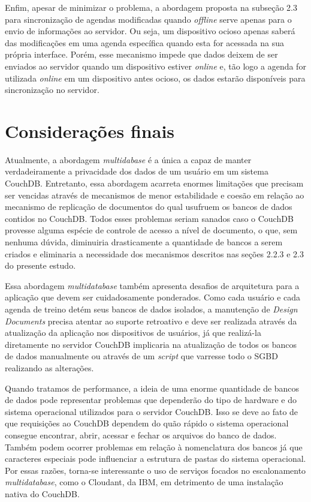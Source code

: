\documentclass[
	article,			%
	11pt,				%
	oneside,			%
	a4paper,			%
	english,			%
	brazil,				%
	sumario=tradicional
	]{abntex2}
\begin{document}
Enfim, apesar de minimizar o problema, a abordagem proposta na subseção 2.3 para sincronização de agendas modificadas quando \textit{offline} serve apenas para o envio de informações ao servidor. Ou seja, um dispositivo ocioso apenas saberá das modificações em uma agenda específica quando esta for acessada na sua própria interface. Porém, esse mecanismo impede que dados deixem de ser enviados ao servidor quando um dispositivo estiver \textit{online} e, tão logo a agenda for utilizada \textit{online} em um dispositivo antes ocioso, os dados estarão disponíveis para sincronização no servidor.

\section*{Considerações finais}

Atualmente, a abordagem \textit{multidabase} é a única a capaz de manter verdadeiramente a privacidade dos dados de um usuário em um sistema CouchDB. Entretanto, essa abordagem acarreta enormes limitações que precisam ser vencidas através de mecanismos de menor estabilidade e coesão em relação ao mecanismo de replicação de documentos do qual usufruem os bancos de dados contidos no CouchDB. Todos esses problemas seriam sanados caso o CouchDB provesse alguma espécie de controle de acesso a nível de documento, o que, sem nenhuma dúvida, diminuiria drasticamente a quantidade de bancos a serem criados e eliminaria a necessidade dos mecanismos descritos nas seções 2.2.3 e 2.3 do presente estudo.

Essa abordagem \textit{multidatabase} também apresenta desafios de arquitetura para a aplicação que devem ser cuidadosamente ponderados. Como cada usuário e cada agenda de treino detém seus bancos de dados isolados, a manutenção de \textit{Design Documents} precisa atentar ao suporte retroativo e deve ser realizada através da atualização da aplicação nos dispositivos de usuários, já que realizá-la diretamente no servidor CouchDB implicaria na atualização de todos os bancos de dados manualmente ou através de um \textit{script} que varresse todo o SGBD realizando as alterações.

Quando tratamos de performance, a ideia de uma enorme quantidade de bancos de dados pode representar problemas que dependerão do tipo de hardware e do sistema operacional utilizados para o servidor CouchDB. Isso se deve ao fato de que requisições ao CouchDB dependem do quão rápido o sistema operacional consegue encontrar, abrir, acessar e fechar os arquivos do banco de dados. Também podem ocorrer problemas em relação à nomenclatura dos bancos já que caracteres especiais pode influenciar a estrutura de pastas do sistema operacional. Por essas razões, torna-se interessante o uso de serviços focados no escalonamento \textit{multidatabase}, como o Cloudant, da IBM, em detrimento de uma instalação nativa do CouchDB.
\end{document}
